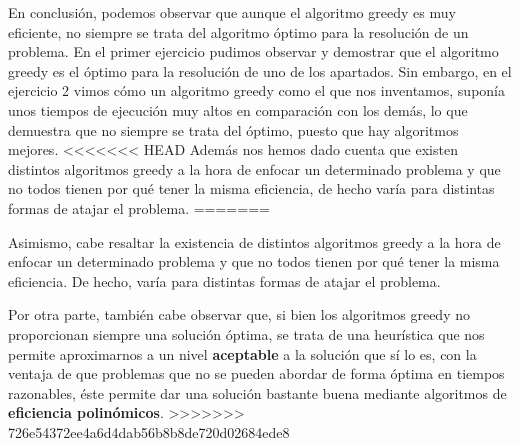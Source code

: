 En conclusión, podemos observar que aunque el algoritmo greedy es muy eficiente, 
no siempre se trata del algoritmo óptimo para la resolución de un problema. 
En el primer ejercicio pudimos observar y demostrar que el algoritmo greedy es 
el óptimo para la resolución de uno de los apartados. Sin embargo, en el ejercicio 2
vimos cómo un algoritmo greedy como el que nos inventamos, 
suponía unos tiempos de ejecución muy altos en comparación con los demás, lo que demuestra que no siempre
se trata del óptimo, puesto que hay algoritmos mejores.
<<<<<<< HEAD
Además nos hemos dado cuenta que existen distintos algoritmos greedy a la hora de enfocar un determinado problema y que no todos tienen por qué tener la misma eficiencia,
de hecho varía para distintas formas de atajar el problema. 
=======

Asimismo, cabe resaltar la existencia de distintos algoritmos greedy a la hora de 
enfocar un determinado problema y que no todos tienen por qué tener la misma eficiencia. 
De hecho, varía para distintas formas de atajar el problema. 

Por otra parte, también cabe observar que, si bien los algoritmos greedy no
proporcionan siempre una solución óptima, se trata de una heurística que nos
permite aproximarnos a un nivel \textbf{aceptable} a la solución que sí lo es, con la 
ventaja de que problemas que no se pueden abordar de forma óptima en tiempos
razonables, éste permite dar una solución bastante buena mediante algoritmos 
de \textbf{eficiencia polinómicos}. 
>>>>>>> 726e54372ee4a6d4dab56b8b8de720d02684ede8
